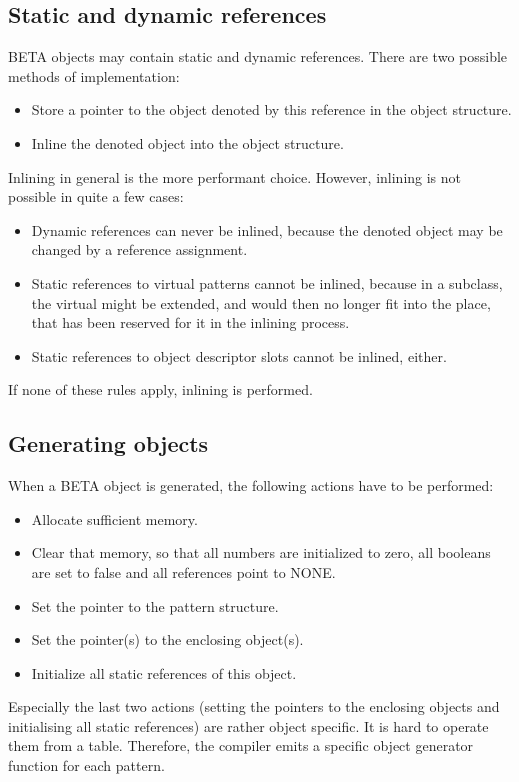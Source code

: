 \subsection{Static and dynamic references}
BETA objects may contain static and dynamic references.  There are
two possible methods of implementation:
\begin{itemize}
\item Store a pointer to the object denoted by this reference in
    the object structure.
\item Inline the denoted object into the object structure.
\end{itemize}
Inlining in general is the more performant choice.  However,
inlining is not possible in quite a few cases:
\begin{itemize}
\item Dynamic references can never be inlined, because the denoted
    object may be changed by a reference assignment.
\item Static references to virtual patterns cannot be inlined,
    because in a subclass, the virtual might be extended, and
    would then no longer fit into the place, that has been
    reserved for it in the inlining process.
\item Static references to object descriptor slots cannot be
    inlined, either.
\end{itemize}
If none of these rules apply, inlining is performed.

\subsection{Generating objects}
When a BETA object is generated, the following actions have to be
performed:
\begin{itemize}
\item Allocate sufficient memory.
\item Clear that memory, so that all numbers are initialized to
    zero, all booleans are set to false and all references point
    to NONE.
\item Set the pointer to the pattern structure.
\item Set the pointer(s) to the enclosing object(s).
\item Initialize all static references of this object.
\end{itemize}
Especially the last two actions (setting the pointers to the
enclosing objects and initialising all static references) are
rather object specific.  It is hard to operate them from a table.
Therefore, the compiler emits a specific object generator
function for each pattern.

